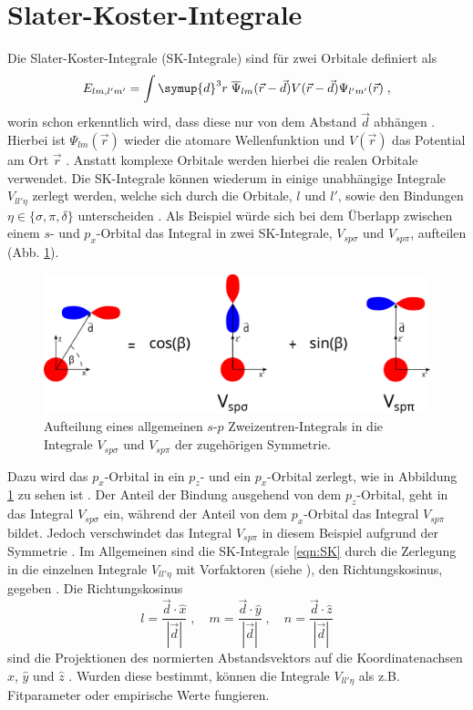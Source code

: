 \section{Slater-Koster-Integrale}
Die Slater-Koster-Integrale (SK-Integrale) sind für zwei Orbitale definiert als
\begin{equation}
    E_{lm,l'm'} = \int \symup{d}^3r \; \overline{\Psi}_{lm} (\vec{r}-\vec{d})
    V(\vec{r} - \vec{d}) \Psi_{l'm'} (\vec{r}) \; , \label{eqn:SK}
\end{equation}
worin schon erkenntlich wird, dass diese nur von dem Abstand $\vec{d}$ abhängen \cite{SC_literature}.
Hierbei ist $\Psi_{lm}(\vec{r})$ wieder die atomare Wellenfunktion und $V(\vec{r})$ das Potential am Ort $\vec{r}$ \cite{SC_literature}.
Anstatt komplexe Orbitale werden hierbei die realen Orbitale verwendet.
Die SK-Integrale können wiederum in einige unabhängige Integrale $V_{ll'\eta}$ zerlegt werden, welche sich durch die Orbitale, $l$ und $l'$, 
sowie den Bindungen $\eta \in \{\sigma ,\pi, \delta \}$ unterscheiden \cite{electronic_structure}.
Als Beispiel würde sich bei dem Überlapp zwischen einem $s$- und $p_x$-Orbital das Integral in zwei 
SK-Integrale, $V_{sp\sigma}$ und $V_{sp\pi}$, aufteilen (Abb. \ref{fig:TC}).
\begin{figure}
    \centering
    \includegraphics[width = \textwidth]{Plots/SK.pdf}
    \caption{Aufteilung eines allgemeinen $s$-$p$ Zweizentren-Integrals in die Integrale $V_{sp\sigma}$ und $V_{sp\pi}$ der zugehörigen Symmetrie.}
    \label{fig:TC}
\end{figure}
Dazu wird das $p_x$-Orbital in ein $p_z$- und ein $p_x$-Orbital zerlegt, wie in Abbildung \ref{fig:TC} zu sehen ist \cite{SC_literature, electronic_structure}.
Der Anteil der Bindung ausgehend von dem $p_z$-Orbital, geht in das Integral $V_{sp\sigma}$ ein, während 
der Anteil von dem $p_x$-Orbital das Integral $V_{sp\pi}$ bildet.
Jedoch verschwindet das Integral $V_{sp\pi}$ in diesem Beispiel aufgrund der Symmetrie \cite{SC_literature}.
Im Allgemeinen sind die SK-Integrale \eqref{eqn:SK} durch die Zerlegung in die einzelnen Integrale $V_{ll'\eta}$ mit Vorfaktoren (siehe \cite{PhysRev.94.1498}),
den Richtungskosinus, gegeben \cite{SC_literature}.
Die Richtungskosinus 
\begin{equation}
    l = \frac{\vec{d} \cdot \hat{x}}{\left | \vec{d} \right |} \; , \quad
    m = \frac{\vec{d} \cdot \hat{y}}{\left | \vec{d} \right |} \; , \quad
    n = \frac{\vec{d} \cdot \hat{z}}{\left | \vec{d} \right |} \label{eqn:RK}
\end{equation}
sind die Projektionen des normierten Abstandsvektors auf die Koordinatenachsen $\hat{x}$, $\hat{y}$ und $\hat{z}$ \cite{SC_literature}.
Wurden diese bestimmt, können die Integrale $V_{ll'\eta}$ als z.B. Fitparameter oder empirische Werte fungieren.